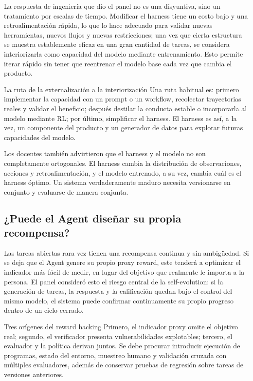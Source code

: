 La respuesta de ingeniería que dio el panel no es una disyuntiva, sino un tratamiento por escalas de tiempo. Modificar el harness tiene un costo bajo y una retroalimentación rápida, lo que lo hace adecuado para validar nuevas herramientas, nuevos flujos y nuevas restricciones; una vez que cierta estructura se muestra establemente eficaz en una gran cantidad de tareas, se considera interiorizarla como capacidad del modelo mediante entrenamiento. Esto permite iterar rápido sin tener que reentrenar el modelo base cada vez que cambia el producto.

\begin{knowledgebox}{La ruta de la externalización a la interiorización}
Una ruta habitual es: primero implementar la capacidad con un prompt o un workflow, recolectar trayectorias reales y validar el beneficio; después destilar la conducta estable o incorporarla al modelo mediante RL; por último, simplificar el harness. El harness es así, a la vez, un componente del producto y un generador de datos para explorar futuras capacidades del modelo.
\end{knowledgebox}

Los docentes también advirtieron que el harness y el modelo no son completamente ortogonales. El harness cambia la distribución de observaciones, acciones y retroalimentación, y el modelo entrenado, a su vez, cambia cuál es el harness óptimo. Un sistema verdaderamente maduro necesita versionarse en conjunto y evaluarse de manera conjunta.

\subsection{¿Puede el Agent diseñar su propia recompensa?}

Las tareas abiertas rara vez tienen una recompensa continua y sin ambigüedad. Si se deja que el Agent genere su propio proxy reward, este tenderá a optimizar el indicador más fácil de medir, en lugar del objetivo que realmente le importa a la persona. El panel consideró esto el riesgo central de la self-evolution: si la generación de tareas, la respuesta y la calificación quedan bajo el control del mismo modelo, el sistema puede confirmar continuamente su propio progreso dentro de un ciclo cerrado.

\begin{warningbox}{Tres orígenes del reward hacking}
Primero, el indicador proxy omite el objetivo real; segundo, el verificador presenta vulnerabilidades explotables; tercero, el evaluador y la política derivan juntos. Se debe procurar introducir ejecución de programas, estado del entorno, muestreo humano y validación cruzada con múltiples evaluadores, además de conservar pruebas de regresión sobre tareas de versiones anteriores.
\end{warningbox}

